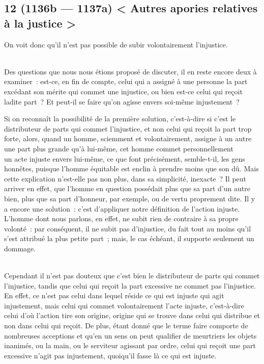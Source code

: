 \documentclass[french,twoside]{book} %
\begin{document}
\subsection[{12 (1136b — 1137a) < Autres apories relatives à la justice >}]{12 (1136b — 1137a) < Autres apories relatives à la justice >}
\noindent On voit donc qu’il n’est pas possible de subir volontairement l’injustice.\par
\\
Des questions que nous nous étions proposé de discuter, il en reste encore deux à examiner : est-ce, en fin de compte, celui qui a assigné à une personne la part excédant son mérite qui commet une injustice, ou bien est-ce celui qui reçoit ladite part ? Et peut-il se faire qu’on agisse envers soi-même injustement ?\par
Si on reconnaît la possibilité de la première solution, c’est-à-dire si c’est le distributeur de parts qui commet l’injustice, et non celui qui reçoit la part trop forte, alors, quand un homme, sciemment et volontairement, assigne à un autre une part plus grande qu’à lui-même, cet homme commet personnellement \\
un acte injuste envers lui-même, ce que font précisément, semble-t-il, les gens honnêtes, puisque l’homme équitable est enclin à prendre moins que son dû. Mais cette explication n’est-elle pas non plus, dans sa simplicité, inexacte ? Il peut arriver en effet, que l’homme en question possédait plus que sa part d’un autre bien, plus que sa part d’honneur, par exemple, ou de vertu proprement dite. Il y a encore une solution : c’est d’appliquer notre définition de l’action injuste. L’homme dont nous parlons, en effet, ne subit rien de contraire à sa propre volonté : par conséquent, il ne subit pas d’injustice, du fait tout au moins qu’il s’est attribué la plus petite part ; mais, le cas échéant, il supporte seulement un dommage.\par
\\
Cependant il n’est pas douteux que c’est bien le distributeur de parts qui commet l’injustice, tandis que celui qui reçoit la part excessive ne commet pas l’injustice. En effet, ce n’est pas celui dans lequel réside ce qui est injuste qui agit injustement, mais celui qui commet volontairement l’acte injuste, c’est-à-dire celui d’où l’action tire son origine, origine qui se trouve dans celui qui distribue et non dans celui qui reçoit. De plus, étant donné que le terme faire comporte de \\
nombreuses acceptions et qu’en un sens on peut qualifier de meurtriers les objets inanimés, ou la main, ou le serviteur agissant par ordre, celui qui reçoit une part excessive n’agit pas injustement, quoiqu’il fasse là ce qui est injuste.\par
\end{document}
